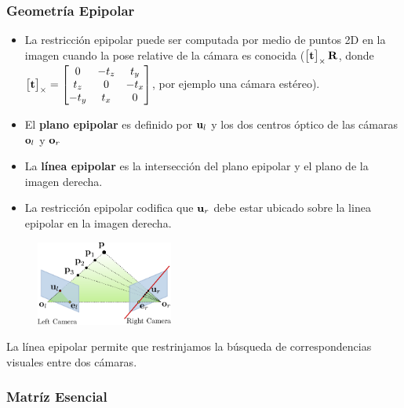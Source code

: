\begin{frame}
    \frametitle{Geometría Epipolar}
    \footnotesize

    \begin{itemize}
        \item La restricción epipolar puede ser computada por medio de puntos 2D en la imagen cuando la pose relative de la cámara es conocida 
        ($\begin{bmatrix}
            \boldsymbol{\mathbf{t}} 
        \end{bmatrix}_{\times} \boldsymbol{\mathbf{R}}$, donde 
        $\begin{bmatrix}
            \boldsymbol{\mathbf{t}} 
        \end{bmatrix}_{\times} =
        \begin{bmatrix}
            0 & -t_{z} & t_{y}\\
            t_{z} & 0 & -t_{x}\\
            -t_{y} & t_{x} & 0
        \end{bmatrix}$, por ejemplo una cámara estéreo).
        \item El \textbf{plano epipolar} es definido por $\boldsymbol{\mathbf{u}}_{l}$ y los dos centros óptico de las cámaras $\boldsymbol{\mathbf{o}}_{l}$ y $\boldsymbol{\mathbf{o}}_{r}$
        \item La \textbf{línea epipolar} es la intersección del plano epipolar y el plano de la imagen derecha.
        \item La restricción epipolar codifica que $\boldsymbol{\mathbf{u}}_{r}$ debe estar ubicado sobre la linea epipolar en la imagen derecha.
    \end{itemize}

    \begin{figure}
        \includegraphics[width=0.4\textwidth]{./images/epipolar_geometry.pdf}
    \end{figure}

    La línea epipolar permite que restrinjamos la búsqueda de correspondencias visuales entre dos cámaras.

\end{frame}

\begin{frame}
    \frametitle{Matríz Esencial}


\end{frame}


